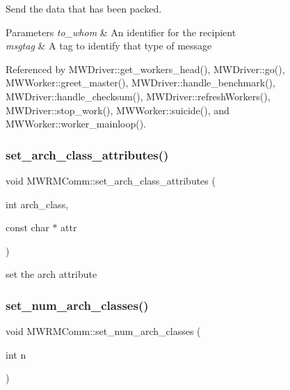 Send the data that has been packed. 
\begin{DoxyParams}{Parameters}
{\em to\+\_\+whom} & An identifier for the recipient \\
\hline
{\em msgtag} & A \textquotesingle{}tag\textquotesingle{} to identify that type of message \\
\hline
\end{DoxyParams}


Referenced by M\+W\+Driver\+::get\+\_\+workers\+\_\+head(), M\+W\+Driver\+::go(), M\+W\+Worker\+::greet\+\_\+master(), M\+W\+Driver\+::handle\+\_\+benchmark(), M\+W\+Driver\+::handle\+\_\+checksum(), M\+W\+Driver\+::refresh\+Workers(), M\+W\+Driver\+::stop\+\_\+work(), M\+W\+Worker\+::suicide(), and M\+W\+Worker\+::worker\+\_\+mainloop().

\mbox{\label{classMWRMComm_acc1a551c808ef615fd02992f0ab9fffb}} 
\subsubsection{\texorpdfstring{set\+\_\+arch\+\_\+class\+\_\+attributes()}{set\_arch\_class\_attributes()}}
{\footnotesize\ttfamily void M\+W\+R\+M\+Comm\+::set\+\_\+arch\+\_\+class\+\_\+attributes (\begin{DoxyParamCaption}\item[{int}]{arch\+\_\+class,  }\item[{const char $\ast$}]{attr }\end{DoxyParamCaption})}

set the arch attribute \mbox{\label{classMWRMComm_a37e1550401acab038a3f1d94f8c50669}} 
\subsubsection{\texorpdfstring{set\+\_\+num\+\_\+arch\+\_\+classes()}{set\_num\_arch\_classes()}}
{\footnotesize\ttfamily void M\+W\+R\+M\+Comm\+::set\+\_\+num\+\_\+arch\+\_\+classes (\begin{DoxyParamCaption}\item[{int}]{n }\end{DoxyParamCaption})}

